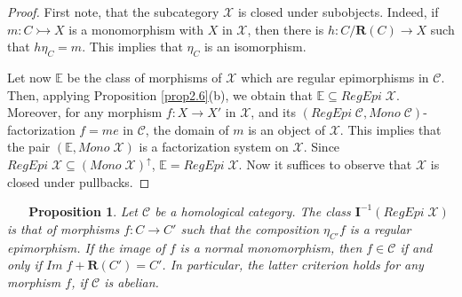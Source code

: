 \documentclass[12pt,reqno,intlim]{amsart}
\numberwithin{equation}{section}
\newtheorem{prop}[theo]{\ \ \ Proposition}
\theoremstyle{definition}
\theoremstyle{remark}
\begin{document}
\begin{proof}
First note, that  the subcategory  $\mathcal{X}$ is closed under subobjects. Indeed, if $m:C\rightarrowtail X$ is a monomorphism with $X$ in $\mathcal{X}$, then there is $h:C/\mathbf{R}(C)\rightarrow X$ such that $h\eta_C=m$. This implies that $\eta_C$ is an isomorphism.

Let now $\mathbb{E}$ be the class of morphisms of $\mathcal{X}$ which are regular epimorphisms in $\mathcal{C}$. Then, applying Proposition \ref{prop2.6}(b), we obtain that $\mathbb{E}\subseteq RegEpi \; \mathcal{X}$. Moreover, for any morphism $f:X\rightarrow X'$ in $\mathcal{X}$, and its $(RegEpi \;\mathcal{C}, Mono \;\mathcal{C})$-factorization $f=me$ in $\mathcal{C}$, the domain of  $m$ is an object of $\mathcal{X}$. This implies that the pair $(\mathbb{E},Mono \;\mathcal{X})$ is a factorization system on $\mathcal{X}$.  Since $RegEpi \;\mathcal{X}\subseteq (Mono \; \mathcal{X})^{\uparrow}$, $\mathbb{E}= RegEpi \; \mathcal{X}$. Now it suffices to observe that $\mathcal{X}$ is closed under pullbacks.

\end{proof}


\begin{prop} \label{prop4.2}
Let $\mathcal{C}$ be a homological category. The class $\mathbf{I}^{-1}(RegEpi \; \mathcal{X})$ is that of morphisms $f:C\rightarrow C'$ such that the composition $\eta_{C'} f$ is a regular epimorphism. If the image of $f$ is a normal monomorphism, then $f\in \mathcal{C}$ if and only if $Im\; f+\mathbf{R}(C')=C'$. In particular, the latter criterion holds for any morphism $f$, if $\mathcal{C}$ is abelian.
\end{prop}
\end{document}
